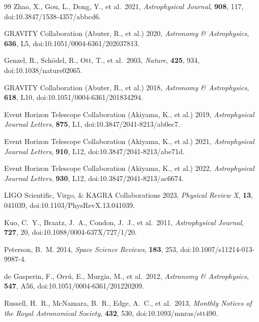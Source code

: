 \documentclass[11pt]{article}
\begin{document}
\begin{thebibliography}{99}
Zhao, X., Gou, L., Dong, Y., et al.\ 2021,
\emph{Astrophysical Journal}, \textbf{908}, 117,
doi:10.3847/1538-4357/abbcd6.

GRAVITY Collaboration (Abuter, R., et al.) 2020,
\emph{Astronomy \& Astrophysics}, \textbf{636}, L5,
doi:10.1051/0004-6361/202037813.

Genzel, R., Sch\"odel, R., Ott, T., et al.\ 2003,
\emph{Nature}, \textbf{425}, 934,
doi:10.1038/nature02065.

GRAVITY Collaboration (Abuter, R., et al.) 2018,
\emph{Astronomy \& Astrophysics}, \textbf{618}, L10,
doi:10.1051/0004-6361/201834294.

Event Horizon Telescope Collaboration (Akiyama, K., et al.) 2019,
\emph{Astrophysical Journal Letters}, \textbf{875}, L1,
doi:10.3847/2041-8213/ab0ec7.

Event Horizon Telescope Collaboration (Akiyama, K., et al.) 2021,
\emph{Astrophysical Journal Letters}, \textbf{910}, L12,
doi:10.3847/2041-8213/abe71d.

Event Horizon Telescope Collaboration (Akiyama, K., et al.) 2022,
\emph{Astrophysical Journal Letters}, \textbf{930}, L12,
doi:10.3847/2041-8213/ac6674.

LIGO Scientific, Virgo, \& KAGRA Collaborations 2023,
\emph{Physical Review X}, \textbf{13}, 041039,
doi:10.1103/PhysRevX.13.041039.

Kuo, C.~Y., Braatz, J.~A., Condon, J.~J., et al.\ 2011,
\emph{Astrophysical Journal}, \textbf{727}, 20,
doi:10.1088/0004-637X/727/1/20.

Peterson, B.~M. 2014,
\emph{Space Science Reviews}, \textbf{183}, 253,
doi:10.1007/s11214-013-9987-4.

de Gasperin, F., Orr\'u, E., Murgia, M., et al.\ 2012,
\emph{Astronomy \& Astrophysics}, \textbf{547}, A56,
doi:10.1051/0004-6361/201220209.

Russell, H.~R., McNamara, B.~R., Edge, A.~C., et al.\ 2013,
\emph{Monthly Notices of the Royal Astronomical Society}, \textbf{432}, 530,
doi:10.1093/mnras/stt490.


\end{thebibliography}
\end{document}
